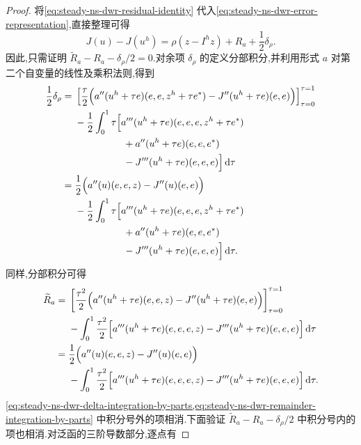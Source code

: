 \begin{proof}
将\cref{eq:steady-ns-dwr-residual-identity} 代入\cref{eq:steady-ns-dwr-error-representation},直接整理可得
\[
  J(u)-J(u^h)
   =\rho(z-I^h z)+R_a+\frac12\delta_\rho.
\]
因此,只需证明 $\widetilde R_a-R_a-\delta_\rho/2=0$.对余项 $\delta_\rho$ 的定义分部积分,并利用形式 $a$ 对第二个自变量的线性及乘积法则,得到
\begin{equation}\label{eq:steady-ns-dwr-delta-integration-by-parts}
\begin{aligned}
  \frac12\delta_\rho
   ={}&\left[\frac{\tau}{2}\Bigl(
      a''(u^h+\tau e)(e,e,z^h+\tau e^*)
      -J''(u^h+\tau e)(e,e)\Bigr)\right]_{\tau=0}^{\tau=1}\\
    &-\frac12\int_0^1\tau\Bigl[
      a'''(u^h+\tau e)(e,e,e,z^h+\tau e^*)\\
    &\qquad\qquad\quad
      +a''(u^h+\tau e)(e,e,e^*)\\
    &\qquad\qquad\quad
      -J'''(u^h+\tau e)(e,e,e)\Bigr]\,\mathrm{d}\tau\\
   ={}&\frac12\Bigl(a''(u)(e,e,z)-J''(u)(e,e)\Bigr)\\
    &-\frac12\int_0^1\tau\Bigl[
      a'''(u^h+\tau e)(e,e,e,z^h+\tau e^*)\\
    &\qquad\qquad\quad
      +a''(u^h+\tau e)(e,e,e^*)\\
    &\qquad\qquad\quad
      -J'''(u^h+\tau e)(e,e,e)\Bigr]\,\mathrm{d}\tau.
\end{aligned}
\end{equation}
同样,分部积分可得
\begin{equation}\label{eq:steady-ns-dwr-remainder-integration-by-parts}
\begin{aligned}
  \widetilde R_a
   ={}&\left[\frac{\tau^2}{2}\Bigl(
      a''(u^h+\tau e)(e,e,z)
      -J''(u^h+\tau e)(e,e)\Bigr)\right]_{\tau=0}^{\tau=1}\\
    &-\int_0^1\frac{\tau^2}{2}\Bigl[
      a'''(u^h+\tau e)(e,e,e,z)
      -J'''(u^h+\tau e)(e,e,e)\Bigr]\,\mathrm{d}\tau\\
   ={}&\frac12\Bigl(a''(u)(e,e,z)-J''(u)(e,e)\Bigr)\\
    &-\int_0^1\frac{\tau^2}{2}\Bigl[
      a'''(u^h+\tau e)(e,e,e,z)
      -J'''(u^h+\tau e)(e,e,e)\Bigr]\,\mathrm{d}\tau.
\end{aligned}
\end{equation}
\cref{eq:steady-ns-dwr-delta-integration-by-parts,eq:steady-ns-dwr-remainder-integration-by-parts} 中积分号外的项相消.下面验证 $\widetilde R_a-R_a-\delta_\rho/2$ 中积分号内的项也相消.对泛函的三阶导数部分,逐点有

\end{proof}
